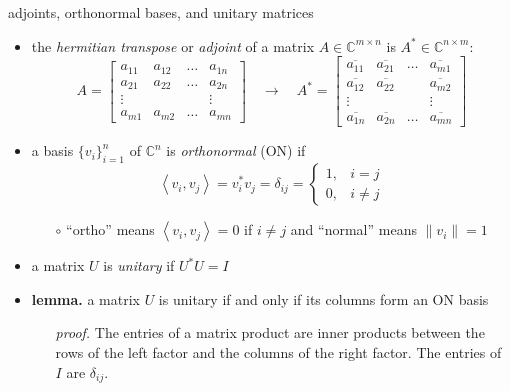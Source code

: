 \documentclass[10pt,hyperref]{beamer}
\newcommand{\CC}{\mathbb{C}}
\newcommand{\ip}[2]{\left<#1,#2\right>}
\begin{document}
\begin{frame}{adjoints, orthonormal bases, and unitary matrices}

\begin{itemize}
\item the \emph{hermitian transpose} or \emph{adjoint} of a matrix $A\in \CC^{m\times n}$ is $A^* \in \CC^{n\times m}$:
    $$A = \begin{bmatrix}
    a_{11} & a_{12} & \dots & a_{1n} \\
    a_{21} & a_{22} & \dots & a_{2n} \\
    \vdots &        &       & \vdots \\
    a_{m1} & a_{m2} & \dots & a_{mn} \end{bmatrix}
    \quad \to \quad
    A^* = \begin{bmatrix}
    \overline{a_{11}} & \overline{a_{21}} & \dots & \overline{a_{m1}} \\
    \overline{a_{12}} & \overline{a_{22}} &       & \overline{a_{m2}} \\
    \vdots            &                   &       & \vdots \\
    \overline{a_{1n}} & \overline{a_{2n}} & \dots & \overline{a_{mn}} \end{bmatrix}$$
\item a basis $\{v_i\}_{i=1}^n$ of $\CC^n$ is \emph{orthonormal} (ON) if
\small
    $$\ip{v_i}{v_j} =v_i^* v_j = \delta_{ij} = \begin{cases} 1, & i=j \\ 0, & i\ne j \end{cases}$$
\normalsize
\vspace{-2mm}
    \begin{itemize}
    \item[$\circ$] ``ortho'' means $\ip{v_i}{v_j}=0$ if $i\ne j$ and ``normal'' means $\|v_i\|=1$
    \end{itemize}
\item a matrix $U$ is \emph{unitary} if $U^* U = I$
\item \textbf{lemma.} a matrix $U$ is unitary if and only if its columns form an ON basis
    \begin{itemize}
    \item[\emph{proof.}] The entries of a matrix product are inner products between the rows of the left factor and the columns of the right factor.  The entries of $I$ are $\delta_{ij}$.
    \end{itemize}
\end{itemize}
\end{frame}
\end{document}
